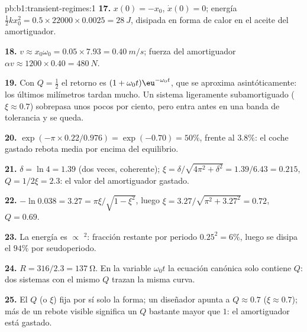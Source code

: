 \begin{solution}{pb:b1:transient-regimes:1}
\textbf{17.} $x(0) = -x_0$, $\dot x(0) = 0$; energía $\tfrac12 kx_0^2 =
0.5 \times 22000 \times 0.0025 = \qty{28}{J}$, disipada en forma de calor
en el aceite del amortiguador.

\textbf{18.} $v \approx x_0\omega_0 = 0.05 \times 7.93 = \qty{0.40}{m/s}$;
fuerza del amortiguador $\alpha v \approx 1200 \times 0.40 = \qty{480}{N}$.

\textbf{19.} Con $Q = \tfrac12$ el retorno es $(1 + \omega_0 t)\eu^{-\omega_0
t}$, que se aproxima asintóticamente: los últimos milímetros tardan mucho.
Un sistema ligeramente subamortiguado ($\xi \approx 0.7$) sobrepasa unos
pocos por ciento, pero entra antes en una banda de tolerancia y se queda.

\textbf{20.} $\exp(-\pi \times 0.22/0.976) = \exp(-0.70) = 50\%$, frente al
$3.8\%$: el coche gastado rebota media  por encima del equilibrio.

\textbf{21.} $\delta = \ln 4 = 1.39$ (dos veces, coherente); $\xi =
\delta/\sqrt{4\pi^2 + \delta^2} = 1.39/6.43 = 0.215$, $Q = 1/2\xi = 2.3$:
el valor del amortiguador gastado.

\textbf{22.} $-\ln 0.038 = 3.27 = \pi\xi/\sqrt{1 - \xi^2}$, luego $\xi =
3.27/\sqrt{\pi^2 + 3.27^2} = 0.72$, $Q = 0.69$.

\textbf{23.} La energía es $\propto$ $^2$: fracción restante por
periodo $0.25^2 = 6\%$, luego se disipa el $94\%$ por seudoperiodo.

\textbf{24.} $R = 316/2.3 = \qty{137}{\ohm}$. En la variable $\omega_0 t$
la ecuación canónica solo contiene $Q$: dos sistemas con el mismo $Q$
trazan la misma curva.

\textbf{25.} El  $Q$ (o $\xi$) fija por sí solo la forma;
un diseñador apunta a $Q \approx 0.7$ ($\xi \approx 0.7$); más de un
rebote visible significa un $Q$ bastante mayor que $1$: el amortiguador
está gastado.
\end{solution}

